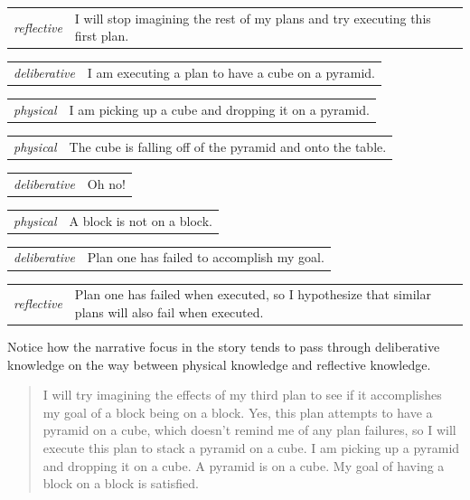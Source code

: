 \begin{tabular}{p{2cm}p{8cm}}
  {\emph{reflective}} & I will stop imagining the rest of my plans and
  try executing this first plan. \\
\end{tabular}

\begin{tabular}{p{2cm}p{8cm}}
  {\emph{deliberative}} & I am executing a plan to have a cube on a
  pyramid. \\
\end{tabular}

\begin{tabular}{p{2cm}p{8cm}}
  {\emph{physical}} & I am picking up a cube and dropping it on a
  pyramid. \\
\end{tabular}

\begin{tabular}{p{2cm}p{8cm}}
  {\emph{physical}} & The cube is falling off of the pyramid and onto
  the table. \\
\end{tabular}

\begin{tabular}{p{2cm}p{8cm}}
  {\emph{deliberative}} & Oh no! \\
\end{tabular}

\begin{tabular}{p{2cm}p{8cm}}
  {\emph{physical}} & A block is not on a block. \\
\end{tabular}

\begin{tabular}{p{2cm}p{8cm}}
  {\emph{deliberative}} & Plan one has failed to accomplish my
  goal. \\
\end{tabular}

\begin{tabular}{p{2cm}p{8cm}}
  {\emph{reflective}} & Plan one has failed when executed, so I
  hypothesize that similar plans will also fail when executed. \\
\end{tabular}

Notice how the narrative focus in the story tends to pass through
deliberative knowledge on the way between physical knowledge and
reflective knowledge.

\begin{quote}
  I will try imagining the effects of my third plan to see if it
  accomplishes my goal of a block being on a block.  Yes, this plan
  attempts to have a pyramid on a cube, which doesn't remind me of any
  plan failures, so I will execute this plan to stack a pyramid on a
  cube.  I am picking up a pyramid and dropping it on a cube.  A
  pyramid is on a cube.  My goal of having a block on a block is
  satisfied.
\end{quote}

